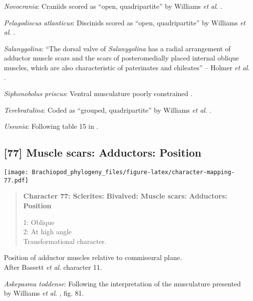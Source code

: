 \documentclass[openany]{book}
\theoremstyle{definition}
\theoremstyle{definition}
\theoremstyle{definition}
\theoremstyle{remark}
\begin{document}
\hypertarget{Novocrania-coding-76}{}
\emph{Novocrania}: Craniids scored as ``open, quadripartite'' by
Williams \emph{et al}. \citeyearpar{Williams1996Asupra}.

\hypertarget{Pelagodiscus_atlanticus-coding-76}{}
\emph{Pelagodiscus atlanticus}: Discinids scored as ``open,
quadripartite'' by Williams \emph{et al}.
\citeyearpar{Williams1996Asupra}.

\hypertarget{Salanygolina-coding-76}{}
\emph{Salanygolina}: ``The dorsal valve of \emph{Salanygolina} has a
radial arrangement of adductor muscle scars and the scars of
posteromedially placed internal oblique muscles, which are also
characteristic of paterinates and chileates'' -- Holmer \emph{et al}.
\citeyearpar{Holmer2009Theenigmatic}.

\hypertarget{Siphonobolus_priscus-coding-76}{}
\emph{Siphonobolus priscus}: Ventral musculature poorly constrained
\citep{Williams2000LinguliformeaCraniiformea, Popov2009Earlyontogeny}.

\hypertarget{Terebratulina-coding-76}{}
\emph{Terebratulina}: Coded as ``grouped, quadripartite'' by Williams
\emph{et al}. \citeyearpar{Williams1996Asupra}.

\hypertarget{Ussunia-coding-76}{}
\emph{Ussunia}: Following table 15 in
\citet{Williams2000LinguliformeaCraniiformea}.

\subsection*{{[}77{]} Muscle scars: Adductors:
Position}\label{muscle-scars-adductors-position}

\texttt{[image: Brachiopod\_phylogeny\_files/figure-latex/character-mapping-77.pdf]}

\begin{quote}
\textbf{Character 77: Sclerites: Bivalved: Muscle scars: Adductors:
Position}

1: Oblique\\
2: At high angle\\
Transformational character.
\end{quote}

Position of adductor muscles relative to commissural plane.\\
After Bassett \emph{et al}.
\citeyearpar{Bassett2001Functionalmorphology} character 11.

\hypertarget{Askepasma_toddense-coding-77}{}
\emph{Askepasma toddense}: Following the interpretation of the
musculature presented by Williams \emph{et al}.
\citeyearpar{Williams2000LinguliformeaCraniiformea}, fig. 81.
\end{document}
